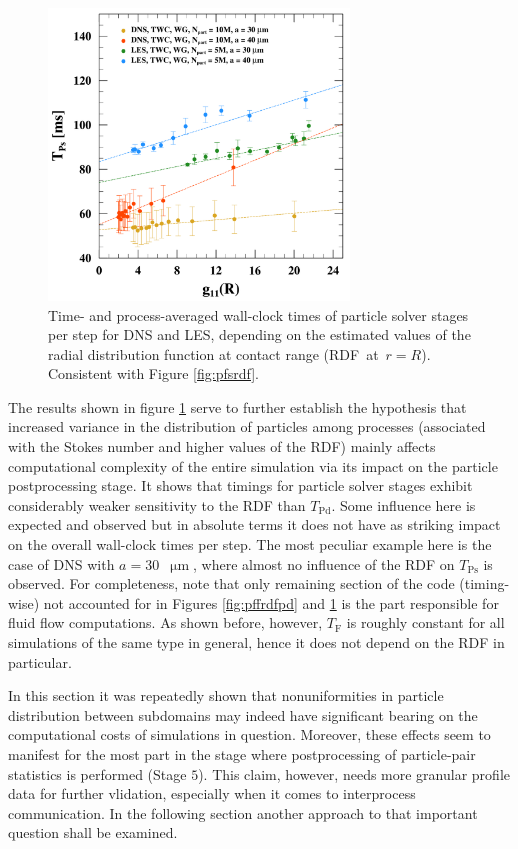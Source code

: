\documentclass{pracamgren}
\begin{document}
\begin{figure}[ht]
\centering
\includegraphics[width=8cm]{figures/3-14_pffrdfps.pdf}
\caption{
Time- and process-averaged wall-clock times of particle solver stages per step for DNS and LES, depending on the estimated values of the radial distribution function at contact range (RDF~at~$r=R$).
Consistent with Figure \ref{fig:pfsrdf}.
}
\label{fig:pffrdfps}
\end{figure}

The results shown in figure \ref{fig:pffrdfps} serve to further establish the hypothesis that increased variance in the distribution of particles among processes (associated with the Stokes number and higher values of the RDF) mainly affects computational complexity of the entire simulation via its impact on the particle postprocessing stage.
It shows that timings for particle solver stages exhibit considerably weaker sensitivity to the RDF than $T_{\text{Pd}}$.
Some influence here is expected and observed but in absolute terms it does not have as striking impact on the overall wall-clock times per step.
The most peculiar example here is the case of DNS with $a = 30$~$\upmu\text{m}$, where almost no influence of the RDF on $T_{\text{Ps}}$ is observed.
For completeness, note that only remaining section of the code (timing-wise) not accounted for in Figures \ref{fig:pffrdfpd} and \ref{fig:pffrdfps} is the part responsible for fluid flow computations.
As shown before, however, $T_{\text{F}}$ is roughly constant for all simulations of the same type in general, hence it does not depend on the RDF in particular.

In this section it was repeatedly shown that nonuniformities in particle distribution between subdomains may indeed have significant bearing on the computational costs of simulations in question.
Moreover, these effects seem to manifest for the most part in the stage where postprocessing of particle-pair statistics is performed (Stage $5$).
This claim, however, needs more granular profile data for further vlidation, especially when it comes to interprocess communication.
In the following section another approach to that important question shall be examined.
\end{document}
